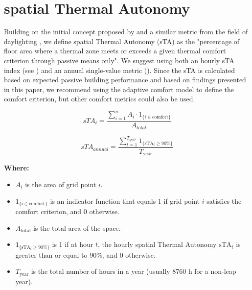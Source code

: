 
\section{spatial Thermal Autonomy}
\label{sec:sta}


Building on the initial concept proposed by \citet{levitt_thermal_2013} and a similar metric from the field of daylighting \citep{heschong_approved_2012}, we define spatial Thermal Autonomy (sTA) as the "percentage of floor area where a thermal zone meets or exceeds a given thermal comfort criterion through passive means only". We suggest using both an hourly sTA index (see ) and an annual single-value metric (). Since the sTA is calculated based on expected passive building performance and based on findings presented in this paper, we recommend using the adaptive comfort model to define the comfort criterion, but other comfort metrics could also be used. 

\begin{equation}\label{eq:sta-hourly}
sTA_{t} = \frac{\sum_{i=1}^{n} A_i \cdot {1}_{\{i \in \text{comfort}\}}}{A_{total}}
\end{equation}


\begin{equation}\label{eq:sta-annual}
sTA_{annual} = \frac{\sum_{t=1}^{T_{year}} {1}_{\{\text{sTA}_t \geq 90\%\}}}{T_{\text{year}}}
\end{equation}

\vspace{0.5cm}


\textbf{Where:}
\begin{itemize}
    \item $A_i$ is the area of grid point $i$.
    \item $1_{\{i \in \text{comfort}\}}$ is an indicator function that equals 1 if grid point $i$ satisfies the comfort criterion, and 0 otherwise.
    \item $A_{\text{total}}$ is the total area of the space.
    \item $1_{\{\text{sTA}_t \geq 90\%\}}$ is 1 if at hour $t$, the hourly spatial Thermal Autonomy $\text{sTA}_t$ is greater than or equal to 90\%, and 0 otherwise.
    \item $T_{\text{year}}$ is the total number of hours in a year (usually 8760 h for a non-leap year).
\end{itemize}

